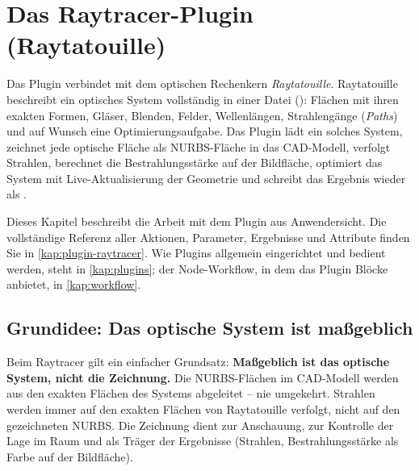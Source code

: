 \chapter{Das Raytracer-Plugin (Raytatouille)}\label{kap:raytracer}

Das Plugin  verbindet \produkt{} mit dem optischen Rechenkern
\emph{Raytatouille}. Raytatouille beschreibt ein optisches System vollständig in einer Datei
(): Flächen mit ihren exakten Formen, Gläser, Blenden, Felder,
Wellenlängen, Strahlengänge (\emph{Paths}) und auf Wunsch eine Optimierungsaufgabe. Das Plugin
lädt ein solches System, zeichnet jede optische Fläche als NURBS-Fläche in das CAD-Modell,
verfolgt Strahlen, berechnet die Bestrahlungsstärke auf der Bildfläche, optimiert das System mit
Live-Aktualisierung der Geometrie und schreibt das Ergebnis wieder als .

Dieses Kapitel beschreibt die Arbeit mit dem Plugin aus Anwendersicht. Die vollständige
Referenz aller Aktionen, Parameter, Ergebnisse und Attribute finden Sie in
\autoref{kap:plugin-raytracer}. Wie Plugins allgemein eingerichtet und bedient werden, steht in
\autoref{kap:plugins}; der Node-Workflow, in dem das Plugin Blöcke anbietet, in
\autoref{kap:workflow}.


\section{Grundidee: Das optische System ist maßgeblich}\label{sec:rt-grundidee}

Beim Raytracer gilt ein einfacher Grundsatz: \textbf{Maßgeblich ist das optische System, nicht
die Zeichnung.} Die NURBS-Flächen im CAD-Modell werden aus den exakten Flächen des Systems
abgeleitet -- nie umgekehrt. Strahlen werden immer auf den exakten Flächen von Raytatouille
verfolgt, nicht auf den gezeichneten NURBS. Die Zeichnung dient zur Anschauung, zur Kontrolle der
Lage im Raum und als Träger der Ergebnisse (Strahlen, Bestrahlungsstärke als Farbe auf der
Bildfläche).

